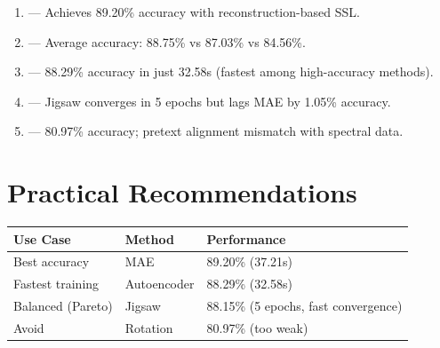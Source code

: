\documentclass[11pt,a4paper]{article}
\begin{document}
\begin{enumerate}
    \item {} — Achieves 89.20\% accuracy with reconstruction-based SSL.
    
    \item {} — Average accuracy: 88.75\% vs 87.03\% vs 84.56\%.
    
    \item {} — 88.29\% accuracy in just 32.58s (fastest among high-accuracy methods).
    
    \item {} — Jigsaw converges in 5 epochs but lags MAE by 1.05\% accuracy.
    
    \item {} — 80.97\% accuracy; pretext alignment mismatch with spectral data.
\end{enumerate}

\section*{Practical Recommendations}

\begin{tabular}{lll}
\toprule
\textbf{Use Case} & \textbf{Method} & \textbf{Performance} \\
\midrule
Best accuracy & MAE & 89.20\% (37.21s) \\
Fastest training & Autoencoder & 88.29\% (32.58s) \\
Balanced (Pareto) & Jigsaw & 88.15\% (5 epochs, fast convergence) \\
Avoid & Rotation & 80.97\% (too weak) \\
\bottomrule
\end{tabular}
\end{document}
